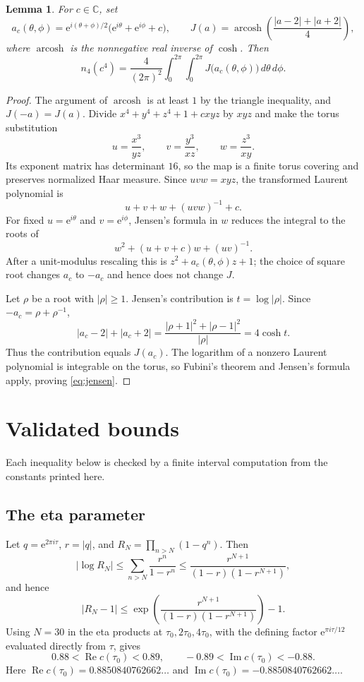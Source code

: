 \documentclass[11pt]{amsart}
\newtheorem{lemma}[theorem]{Lemma}
\newcommand{\e}{\mathrm e}
\DeclareMathOperator{\arcosh}{arcosh}
\renewcommand{\Re}{\operatorname{Re}}
\renewcommand{\Im}{\operatorname{Im}}
\begin{document}
\begin{lemma}\label{lem:jensen}
For $c\in\mathbb C$, set
\[
 a_c(\theta,\phi)
 =\e^{i(\theta+\phi)/2}\bigl(\e^{i\theta}+\e^{i\phi}+c\bigr),
 \qquad
 J(a)=\arcosh\left(\frac{|a-2|+|a+2|}{4}\right),
\]
where $\arcosh$ is the nonnegative real inverse of $\cosh$. Then
\begin{equation}\label{eq:jensen}
 n_4(c^4)=\frac4{(2\pi)^2}
 \int_0^{2\pi}\!\int_0^{2\pi}
 J\bigl(a_c(\theta,\phi)\bigr)\,d\theta\,d\phi.
\end{equation}
\end{lemma}

\begin{proof}
The argument of $\arcosh$ is at least $1$ by the triangle inequality,
and $J(-a)=J(a)$. Divide
$x^4+y^4+z^4+1+cxyz$ by $xyz$ and make the torus substitution
\[
 u=\frac{x^3}{yz},\qquad
 v=\frac{y^3}{xz},\qquad
 w=\frac{z^3}{xy}.
\]
Its exponent matrix has determinant $16$, so the map is a finite
torus covering and preserves normalized Haar measure. Since
$uvw=xyz$, the transformed Laurent polynomial is
\[
 u+v+w+(uvw)^{-1}+c.
\]
For fixed $u=\e^{i\theta}$ and $v=\e^{i\phi}$, Jensen's formula in $w$
reduces the integral to the roots of
\[
 w^2+(u+v+c)w+(uv)^{-1}.
\]
After a unit-modulus rescaling this is
$z^2+a_c(\theta,\phi)z+1$; the choice of square root changes $a_c$ to
$-a_c$ and hence does not change $J$.

Let $\rho$ be a root with $|\rho|\ge1$. Jensen's contribution is
$t=\log|\rho|$. Since $-a_c=\rho+\rho^{-1}$,
\[
 |a_c-2|+|a_c+2|
 =\frac{|\rho+1|^2+|\rho-1|^2}{|\rho|}
 =4\cosh t.
\]
Thus the contribution equals $J(a_c)$. The logarithm of a nonzero
Laurent polynomial is integrable on the torus, so Fubini's theorem and
Jensen's formula apply, proving \eqref{eq:jensen}.
\end{proof}

\section{Validated bounds}

Each inequality below is checked by a finite interval computation from
the constants printed here.

\subsection*{The eta parameter}

Let $q=\e^{2\pi i\tau}$, $r=|q|$, and
$R_N=\prod_{n>N}(1-q^n)$. Then
\[
 |\log R_N|
 \le \sum_{n>N}\frac{r^n}{1-r^n}
 \le \frac{r^{N+1}}{(1-r)(1-r^{N+1})},
\]
and hence
\begin{equation}\label{eq:eta-tail}
 |R_N-1|
 \le \exp\left(\frac{r^{N+1}}
 {(1-r)(1-r^{N+1})}\right)-1.
\end{equation}
Using $N=30$ in the eta products at
$\tau_0,2\tau_0,4\tau_0$, with the defining factor
$\e^{\pi i\tau/12}$ evaluated directly from $\tau$, gives
\begin{equation}\label{eq:c-box}
 0.88<\Re c(\tau_0)<0.89,
 \qquad
 -0.89<\Im c(\tau_0)<-0.88.
\end{equation}
Here $\Re c(\tau_0)=0.8850840762662\ldots$ and
$\Im c(\tau_0)=-0.8850840762662\ldots$.
\end{document}
